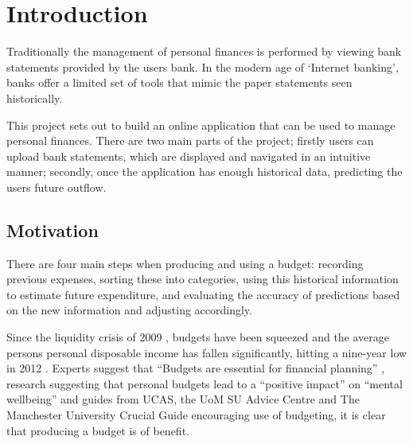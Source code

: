 \begin{comment}
This chapter puts the work into context. Having read it, the reader should be left in no doubt as to:

- the topic area to which the work applies
- why the work is being done
- what else has been done in the area and by whom
 - how the author proposes to tackle the problem: The project proposal is often expressed in terms of a main objective and possibly one or more additional objectives. It is useful to define "milestones" or "sub-goals" that mark the progress towards the objectives. 
 - It is common to end this chapter with a brief overview of each of the subsequent chapters of the report.
 
\end{comment}

\chapter{Introduction}
\label{cha:introduction}
Traditionally the management of personal finances is performed by viewing bank statements provided by the users bank. In the modern age of `Internet banking', banks offer a limited set of tools that mimic the paper statements seen historically.

This project sets out to build an online application that can be used to manage personal finances. There are two main parts of the project; firstly users can upload bank statements, which are displayed and navigated in an intuitive manner; secondly, once the application has enough historical data, predicting the users future outflow.

\section{Motivation}
There are four main steps when producing and using a budget: recording previous expenses, sorting these into categories, using this historical information to estimate future expenditure, and evaluating the accuracy of predictions based on the new information and adjusting accordingly.

Since the liquidity crisis of 2009 \parencite{gore2010}, budgets have been squeezed and the average persons personal disposable income has fallen significantly, hitting a nine-year low in 2012 \parencite{barnard2012households}. Experts suggest that ``Budgets are essential for financial planning'' \parencite{wsj2013budget}, research suggesting that personal budgets lead to a ``positive impact'' on ``mental wellbeing'' \parencite{tlap2013budget} and guides from UCAS, the UoM SU Advice Centre and The Manchester University Crucial Guide encouraging use of budgeting, it is clear that producing a budget is of benefit.

